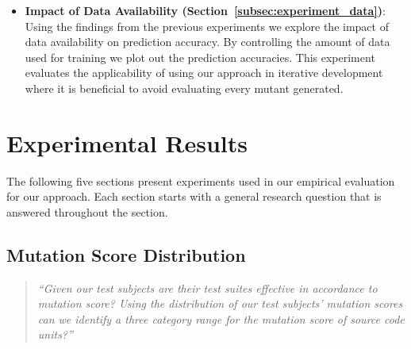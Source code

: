 \begin{itemize}
  \item \textbf{Impact of Data Availability (Section~\ref{subsec:experiment_data})}: Using the findings from the previous experiments we explore the impact of data availability on prediction accuracy. By controlling the amount of data used for training we plot out the prediction accuracies. This experiment evaluates the applicability of using our approach in iterative development where it is beneficial to avoid evaluating every mutant generated.
\end{itemize}


\section{Experimental Results}
\label{sec:experiment_results}
The following five sections present experiments used in our empirical evaluation for our approach. Each section starts with a general research question that is answered throughout the section.


\subsection{Mutation Score Distribution}
\label{subsec:experiment_mutation_score_distribution}
\begin{quote}
	\emph{``Given our test subjects are their test suites effective in accordance to mutation score? Using the distribution of our test subjects' mutation scores can we identify a three category range for the mutation score of source code units?''}
\end{quote}

